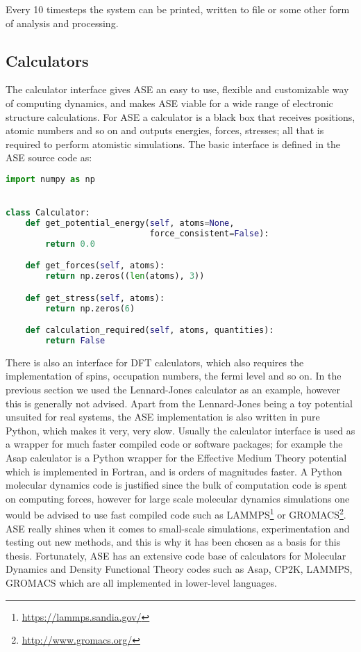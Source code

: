 Every 10 timesteps the system can be printed, written to file
or some other form of analysis and processing.

\subsection{Calculators}
The calculator interface gives ASE an easy to use,
flexible and customizable way of computing dynamics,
and makes ASE viable for a wide range of electronic structure calculations.
For ASE a calculator is a black box that receives positions, atomic
numbers and so on and outputs energies, forces, stresses;
all that is required to perform atomistic simulations.
The basic interface is defined in the ASE source code as:

\begin{lstlisting}[language=python,basicstyle=\small]
import numpy as np


class Calculator:
    def get_potential_energy(self, atoms=None, 
                             force_consistent=False):
        return 0.0

    def get_forces(self, atoms):
        return np.zeros((len(atoms), 3))

    def get_stress(self, atoms):
        return np.zeros(6)

    def calculation_required(self, atoms, quantities):
        return False
\end{lstlisting}

There is also an interface for DFT calculators, which also
requires the implementation of spins, occupation numbers,
the fermi level and so on.
\newline
\newline
In the previous section we used the Lennard-Jones calculator
as an example, however this is generally not advised.
Apart from the Lennard-Jones being a toy potential unsuited
for real systems, the ASE implementation is also written in pure
Python, which makes it very, very slow.
Usually the calculator interface is used as a wrapper for much faster
compiled code or software packages; for example the
Asap calculator is a Python wrapper for the Effective Medium Theory
potential which is implemented in Fortran, and is orders of magnitudes
faster. A Python molecular dynamics code is justified
since the bulk of computation code is spent on computing forces,
however for large scale molecular dynamics simulations
one would be advised to use fast compiled code such as LAMMPS\footnote{
\url{https://lammps.sandia.gov/}} or GROMACS\footnote{
\url{http://www.gromacs.org/}}.
ASE really shines when it comes to small-scale simulations,
experimentation and testing out new methods, and this is why
it has been chosen as a basis for this thesis.
Fortunately, ASE has an extensive code base of calculators
for Molecular Dynamics and Density Functional Theory codes
such as Asap, CP2K, LAMMPS, GROMACS which are all
implemented in lower-level languages.
